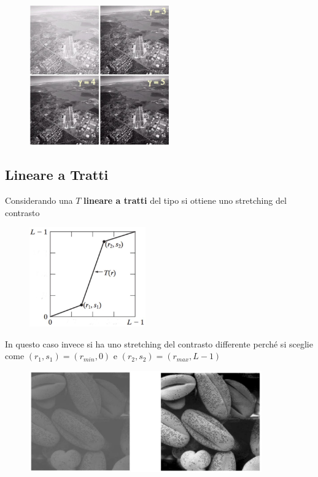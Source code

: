 \begin{figure}[H]
    \centering
    \includegraphics[width=6cm, keepaspectratio]{capitoli/immagini/imgs/foto_esempio_5.jpg}
\end{figure}

\subsection{Lineare a Tratti}

Considerando una $T$ \textbf{lineare a tratti} del tipo si ottiene uno
stretching del contrasto

\begin{figure}[H]
    \centering
    \includegraphics[width=5cm, keepaspectratio]{capitoli/immagini/imgs/lineare_a_tratti_esempio_6.jpg}
\end{figure}

In questo caso invece si ha uno stretching del contrasto differente perché si
sceglie come $(r_1, s_1) = (r_{min}, 0)$ e $(r_2, s_2) = (r_{max} , L - 1)$

\begin{figure}[H]
    \centering
    \includegraphics[width=10cm, keepaspectratio]{capitoli/immagini/imgs/globuli_rossi.jpg}
\end{figure}

